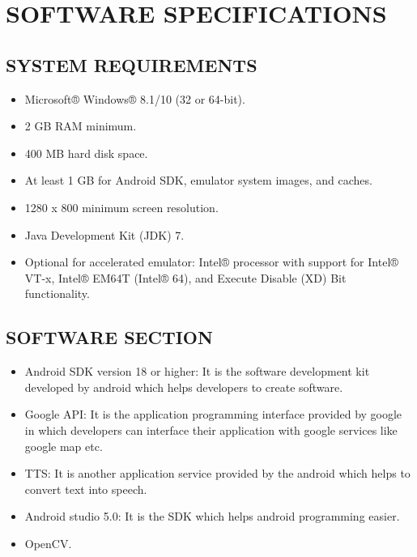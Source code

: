 \documentclass[11pt,a4paper,twoside]{report}
\begin{document}
\chapter{SOFTWARE SPECIFICATIONS}
\section{SYSTEM REQUIREMENTS}
\begin{itemize}
\item Microsoft® Windows® 8.1/10 (32 or 64-bit).
\item 2 GB RAM minimum.
\item 400 MB hard disk space.
\item At least 1 GB for Android SDK, emulator system images, and caches.
\item 1280 x 800 minimum screen resolution.
\item Java Development Kit (JDK) 7.
\item Optional for accelerated emulator: Intel® processor with support for Intel® VT-x, Intel® EM64T (Intel® 64), and Execute Disable (XD) Bit functionality.

\end{itemize}
\section{SOFTWARE SECTION}
\begin{itemize}
\item Android SDK version 18 or higher: It is the software development kit developed
by android which helps developers to create software.
\item Google API: It is the application programming interface provided by google in
which developers can interface their application with google services like google
map etc.
\item TTS: It is another application service provided by the android which helps to
convert text into speech.
\item Android studio 5.0: It is the SDK which helps android programming easier.
\item OpenCV.
\end{itemize}
\end{document}
